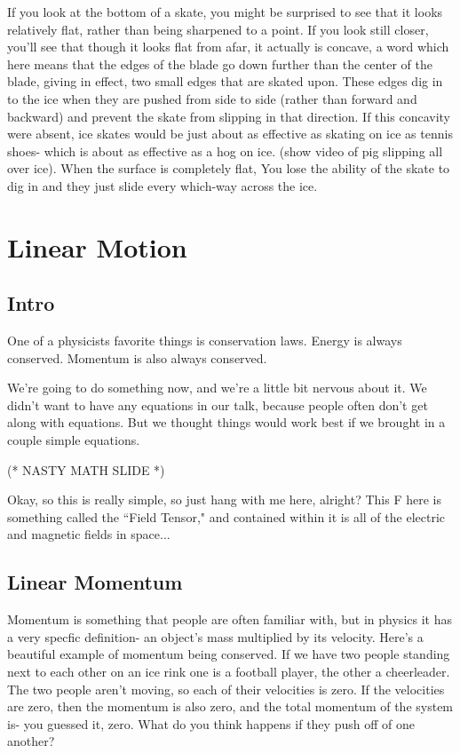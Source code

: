 \documentclass[12pt]{article}
\begin{document}
If you look at the bottom of a skate, you might be surprised to see that it looks relatively
flat, rather than being sharpened to a point. If you look still closer, you'll see that 
though it looks flat from afar, it actually is concave, a word which here means that the
edges of the blade go down further than the center of the blade, giving in effect, two small 
edges that are skated upon. These edges dig in to the ice when they are pushed from side
to side (rather than forward and backward) and prevent the skate from slipping in that direction. 
If this concavity were absent, ice skates would be just about as
effective as skating on ice as tennis shoes- which is about as effective as a hog on ice.
(show video of pig slipping all over ice). When the surface is completely flat, 
You lose the ability of the skate to dig in
and they just slide every which-way across the ice. 

\section{Linear Motion}
\subsection{Intro}
One of a physicists favorite things is conservation 
laws. Energy is always conserved. Momentum is also always conserved. 

We're going to do something now, and we're a little bit nervous about it.
We didn't want to have any equations in our talk, because people often 
don't get along with equations. But we thought things would work best 
if we brought in a couple simple equations. 

(* NASTY MATH SLIDE *)

Okay, so this is really simple, so just hang with me here, alright? 
This F here is something called the ``Field Tensor," and 
contained within it is all of the electric and magnetic fields in space... 
\subsection{Linear Momentum}
Momentum is something
that people are often familiar with, but in physics it has a very specfic definition-
an object's mass multiplied by its velocity.
Here's a beautiful example of momentum being conserved. If we have two people standing next to each other on 
an ice rink one is a football player, the other a cheerleader. The two people aren't moving,
so each of their velocities is zero. If the velocities are zero, then the momentum is 
also zero, and the total momentum of the system is- you guessed it, zero. 
What do you think happens if they push off of one another? 
\end{document}
